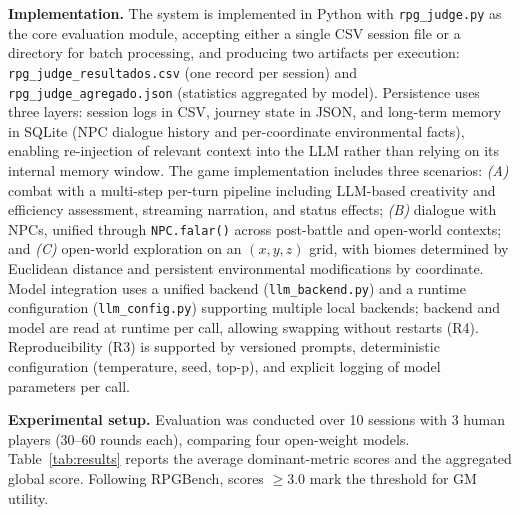 \documentclass[12pt]{article}
\begin{document}
\textbf{Implementation.} The system is implemented in Python with \texttt{rpg\_judge.py} as the core evaluation module, accepting either a single CSV session file or a directory for batch processing, and producing two artifacts per execution: \texttt{rpg\_judge\_resultados.csv} (one record per session) and \texttt{rpg\_judge\_agregado.json} (statistics aggregated by model). Persistence uses three layers: session logs in CSV, journey state in JSON, and long-term memory in SQLite (NPC dialogue history and per-coordinate environmental facts), enabling re-injection of relevant context into the LLM rather than relying on its internal memory window. The game implementation includes three scenarios: \textit{(A)} combat with a multi-step per-turn pipeline including LLM-based creativity and efficiency assessment, streaming narration, and status effects; \textit{(B)} dialogue with NPCs, unified through \texttt{NPC.falar()} across post-battle and open-world contexts; and \textit{(C)} open-world exploration on an $(x,y,z)$ grid, with biomes determined by Euclidean distance and persistent environmental modifications by coordinate. Model integration uses a unified backend (\texttt{llm\_backend.py}) and a runtime configuration (\texttt{llm\_config.py}) supporting multiple local backends; backend and model are read at runtime per call, allowing swapping without restarts (R4). Reproducibility (R3) is supported by versioned prompts, deterministic configuration (temperature, seed, top-p), and explicit logging of model parameters per call.

\textbf{Experimental setup.} Evaluation was conducted over 10 sessions with 3 human players (30--60 rounds each), comparing four open-weight models. Table~\ref{tab:results} reports the average dominant-metric scores and the aggregated global score. Following RPGBench, scores $\geq 3.0$ mark the threshold for GM utility.
\end{document}

